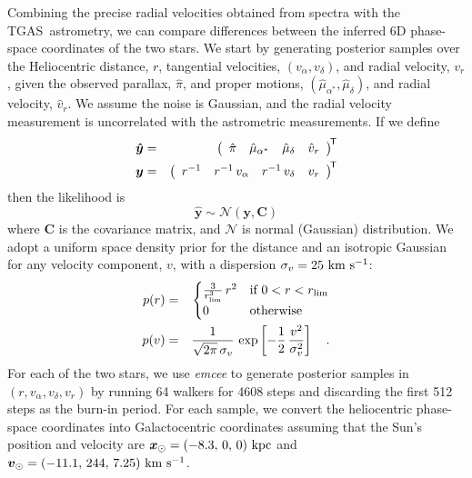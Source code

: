 \documentclass[12pt,letterpaper,margin=1in]{article}
\newcommand{\project}[1]{\textsl{#1}}
\newcommand{\acronym}[1]{{\small{#1}}}
\newcommand{\tgas}{\acronym{TGAS}}
\newcommand{\transp}[1]{{#1}^{\!\mathsf{T}}}
\newcommand{\bs}[1]{\boldsymbol{#1}}
\newcommand{\mat}[1]{\mathbf{#1}}
\renewcommand{\vec}[1]{\bs{#1}}
\newcommand{\kms}{\ensuremath{\rm km~s^{-1}}}
\begin{document}
Combining the precise radial velocities obtained from spectra with the \tgas\
astrometry, we can compare differences between the inferred 6D phase-space
coordinates of the two stars.
We start by generating posterior samples over the Heliocentric distance, $r$,
tangential velocities, $(v_\alpha, v_\delta)$, and radial velocity, $v_r$,
given the observed parallax, $\hat\pi$, and proper motions,
$(\hat\mu_{\alpha^*}, \hat\mu_\delta)$, and radial velocity, $\hat v_r$.
We assume the noise is Gaussian, and the radial velocity measurement is
uncorrelated with the astrometric measurements.
If we define
\begin{eqnarray}
  \vec{\hat y} &=&
      \transp{\left(
        \begin{array}{c@{\hspace{1em}} c@{\hspace{1em}} c@{\hspace{1em}} c}
          \hat\pi &
          \hat\mu_{\alpha^*} &
          \hat\mu_\delta &
          \hat v_r
        \end{array}
      \right)}\\
  \vec{y} &=&
      \transp{\left(
        \begin{array}{c@{\hspace{1em}} c@{\hspace{1em}} c@{\hspace{1em}} c}
          r^{-1} &
          r^{-1}\,v_\alpha &
          r^{-1}\,v_\delta &
          v_r
        \end{array}
      \right)}
\end{eqnarray}
then the likelihood is
\begin{equation}
  \vec{\hat y} \sim \mathcal{N}(\vec{y}, \mat{C})
\end{equation} where $\mat{C}$ is the covariance matrix, and $\mathcal{N}$ is
normal (Gaussian) distribution.
We adopt a uniform space density prior for the distance and an isotropic
Gaussian for any velocity component, $v$, with a dispersion $\sigma_v=25~\kms$:
\begin{eqnarray}
p(r) &=&
  \begin{cases}
    \frac{3}{r_{\rm lim}^3} \, r^2 & \text{if } 0 < r < r_{\rm lim}\\
    0              & \text{otherwise}
  \end{cases}\\
p(v) &=& \frac{1}{\sqrt{2\pi}\,\sigma_v} \,
  \exp\left[-\frac{1}{2} \, \frac{v^2}{\sigma_v^2} \right] \quad .
\end{eqnarray}
%
For each of the two stars, we use \project{emcee}\cite{2013PASP..125..306F}
to generate posterior samples in $(r, v_\alpha, v_\delta, v_r)$
by running 64 walkers for 4608 steps and discarding the first
512 steps as the burn-in period.
For each sample, we convert the heliocentric phase-space coordinates into
Galactocentric coordinates assuming that the Sun's position and velocity are
$\vec x_\odot = (-8.3,\,0,\,0)~{\rm kpc}$ and $\vec v_\odot =
(-11.1,\,244,\,7.25)~\kms$\cite{Schonrich:2010, Schonrich:2012}.
\end{document}
